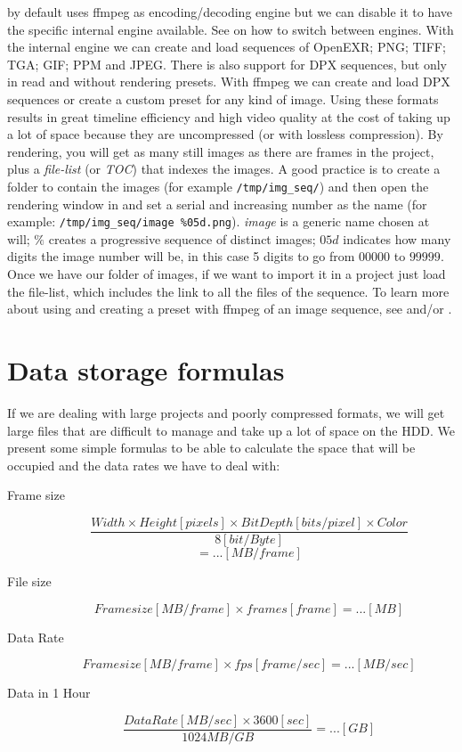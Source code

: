 \CGG{} by default uses ffmpeg as encoding/decoding engine but we can disable it to have the specific internal engine available. See  on how to switch between engines. With the internal engine we can create and load sequences of OpenEXR; PNG; TIFF; TGA; GIF; PPM and JPEG. There is also support for DPX sequences, but only in read and without rendering presets. With ffmpeg we can create and load DPX sequences or create a custom preset for any kind of image. Using these formats results in great timeline efficiency and high video quality at the cost of taking up a lot of space because they are uncompressed (or with lossless compression).
By rendering, you will get as many still images as there are frames in the project, plus a \textit{file-list} (or \textit{TOC}) that indexes the images. A good practice is to create a folder to contain the images (for example \texttt{/tmp/img\_seq/}) and then open the rendering window in \CGG{} and set a serial and increasing number as the name (for example: \texttt{/tmp/img\_seq/image \%05d.png}). \textit{image} is a generic name chosen at will; $\%$ creates a progressive sequence of distinct images; $05d$ indicates how many digits the image number will be, in this case 5 digits to go from $00000$ to $99999$.
Once we have our folder of images, if we want to import it in a project just load the file-list, which includes the link to all the files of the sequence.
To learn more about using and creating a preset with ffmpeg of an image sequence, see  and/or .

\section{Data storage formulas}%
\label{sec:data_storage_formulas}

If we are dealing with large projects and poorly compressed formats, we will get large files that are difficult to manage and take up a lot of space on the HDD. We present some simple formulas to be able to calculate the space that will be occupied and the data rates we have to deal with:

\begin{description}
	\item[Frame size] 
	
	\[ \dfrac{Width \times Height [pixels] \times BitDepth [bits/pixel] \times Color}{8 [bit/Byte]} \] 	
	\[= ... [MB/frame] \]
	\item[File size] 
	
	\[ Frame size [MB/frame] \times frames [frame] = ... [MB] \]
	\item[Data Rate] 
	
	\[ Frame size [MB/frame] \times fps [frame/sec] = ... [MB/sec] \]
	\item[Data in 1 Hour] 
	
	\[ \dfrac{Data Rate [MB/sec] \times 3600 [sec]}{1024MB/GB}  = ... [GB] \]	
\end{description}

